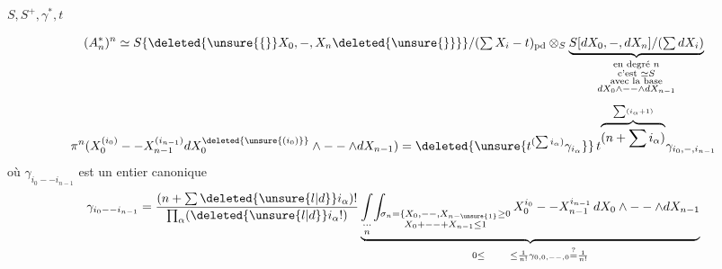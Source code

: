 $S,S^+,\gamma^*,t$

\[
 (A_n^*)^n\simeq S\{\deleted{\unsure{\{}}X_0,-,X_n\deleted{\unsure{\}}}\}/(\textstyle\sum X_i-t)_{\mathrm{pd}}\otimes_S
 \underbrace{S[dX_0,-,dX_n]/(\textstyle\sum dX_i)}_{
 \substack{\text{en degré }n\\\text{c'est }\simeq S\\\text{avec la base}\\dX_0\wedge--\wedge dX_{n-1}}}
\]
\[
 \pi^n(X_0^{(i_0)}--X_{n-1}^{(i_{n-1})}dX_0^{\deleted{\unsure{(i_0)}}}\wedge--\wedge dX_{n-1})
 =\deleted{\unsure{t^{(\sum i_\alpha)}\gamma_{i_\alpha}}}\,t^{\overbrace{(n+\sum i_\alpha)}^{\sum(i_\alpha+1)}}\gamma_{i_0,-,i_{n-1}}
\]
où $\gamma_{i_0--i_{n-1}}$ est un entier canonique
\[
 \gamma_{i_0--i_{n-1}}=\frac{(n+\sum\deleted{\unsure{l|d}}i_\alpha)!}{\prod_\alpha(\deleted{\unsure{l|d}}i_\alpha!)}
 \underbrace{\underset{\substack{\cdots\\ n}}{\int}\!\int_{\substack{\sigma_n=\{X_0,--,X_{n-\unsure{1}}\geq0\\X_0+--+X_{n-1}\leq1}}
 X_0^{i_0}--X_{n-1}^{i_{n-1}}\,dX_0\wedge--\wedge dX_{n-1}}_{0\leq\qquad\leq\frac1{n!}\gamma_{0,0,--,0}\mathrel{\overset{?}{=}}\frac1{n!}}
\]

